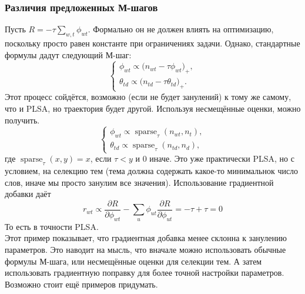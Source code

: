 \documentclass[12pt]{article}
\DeclareMathOperator{\sparse}{sparse}
\begin{document}
 \subsubsection{Различия предложенных М-шагов}
Пусть $R = -\tau \sum\limits_{w, t} \phi_{wt}$. Формально он не должен влиять на оптимизацию, поскольку просто равен константе при ограничениях задачи. Однако, стандартные формулы дадут следующий М-шаг:
\[
\left\{
	\begin{aligned}
		\phi_{wt} \propto \bigl( n_{wt} - \tau \phi_{wt}\bigr)_{+},\\
		\theta_{td} \propto \bigl( n_{td} - \tau \theta_{td}\bigr)_{+}.
	\end{aligned}
\right.
\]
Этот процесс сойдётся, возможно (если не будет занулений) к тому же самому, что и PLSA, но траектория будет другой. Используя несмещённые оценки, можно получить.
\[
\left\{
	\begin{aligned}
		\phi_{wt} \propto  \sparse_{\tau}(n_{wt}, n_{t}),\\
		\theta_{td} \propto \sparse_{\tau}(n_{td}, n_{d}),
	\end{aligned}
\right.
\]
где $\sparse_{\tau}(x, y) = x$, если $\tau < y$ и $0$ иначе. Это уже практически PLSA, но с условием, на селекцию тем (тема должна содержать какое-то минимальнок число слов, иначе мы просто занулим все  значения).
Использование градиентной добавки даёт 
\[
r_{wt} \propto \frac{\partial{R}}{\partial{\phi_{wt}}} - \sum\limits_u \phi_{ut} \frac{\partial{R}}{\partial{\phi_{ut}}} = -\tau + \tau =0
\]
То есть в точности PLSA.\\

Этот пример показывает, что градиентная добавка менее склонна к занулению параметров. Это наводит на мысль, что вначале можно использовать обычные формулы М-шага, или несмещённые оценки для селекции тем. А затем использовать градиентную поправку для более точной настройки параметров.\\

Возможно стоит ещё примеров придумать.
\end{document}
